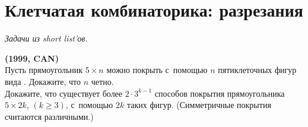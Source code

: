 

\section*{Клетчатая комбинаторика: разрезания}


\begingroup
\providecommand\ifincludesolutions{\iffalse}



\emph{Задачи из short list'ов.}

\ifincludesolutions
\textbf{Версия с решениями.}
\emph{Решения являются слабообработанным переводом с~английского.
Beware!}
\fi

\begin{problems}

\item\textbf{(1999, CAN)}
\\
\sp
Пусть прямоугольник $5 \times n$ можно покрыть с~помощью $n$ пятиклеточных
фигур вида .
Докажите, что $n$ четно.
\\
\sp
Докажите, что существует более $2 \cdot 3^{k-1}$ способов покрытия
прямоугольника $5 \times 2 k$, $(k \geq 3)$, с~помощью $2k$ таких фигур.
(Симметричные покрытия считаются различными.)

\end{problems}

\ifincludesolutions
\setcounter{jeolmsubproblem}{0}%
\sp
Покрасим первый, третий и~пятый ряды в~красный, а~остальные квадратики в~белый.
Всего $n$ фигур и~$3n$ красных квадратов.
Поскольку каждая фигура покрывает не~более трех красных квадратов, она должна
покрывать ровно 3 красных квадратика.
Отсюда следует, что два белых квадратика, покрытых фигурой, лежат в~одном ряду,
иначе их~будет не~менее трех.
Следовательно, каждый белый ряд разбивается на~пары квадратов, принадлежащих
одному кусочку.
Отсюда следует, что количество клеток в~ряду, равное $n$, четно.
\par
\sp
За~$a_k$ обозначим количество различных покрытий прямоугольника $5 \times 2k$.
За~$b_k$ обозначим количество покрытий, не~разбивающихся на~меньшие разбиения
вертикальной линией (без пересечения кусочков).
Легко видеть, что $a_1 = b_1 = 2$, $b_2 = 2$, $a_2 = 6 = 2 \cdot 3$, $b_3 = 4$,
и~далее, по~индукции, $b_{3k} \geq 4$, $b_{3k+1} \geq 2$ и~$b_{3k+2} \geq 2$.
Также $a_k = b_k + \sum_{i=1}^{k-1} b_i a_{k-i}$.
При $k \geq 3$ по~индукции
\[
    a_k
>
    2 + \sum_{i=1}^{k-1} 2 a_{k-i}
\geq
    2\cdot3^{k-1}+2a_{k-1}
\geq
    2\cdot 3^k
\,.\]
\fi %


